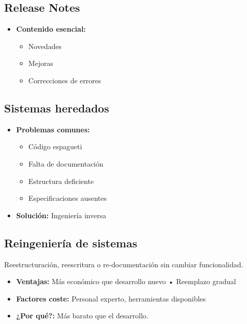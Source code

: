 \subsection{Release Notes}\label{subsec:release-notes}
\begin{itemize}
    \item \textbf{Contenido esencial:}
    \begin{itemize}
        \item Novedades
        \item Mejoras
        \item Correcciones de errores
    \end{itemize}
\end{itemize}

\subsection{Sistemas heredados}\label{subsec:sistemas-heredados}
\begin{itemize}
    \item \textbf{Problemas comunes:}
    \begin{itemize}
        \item Código espagueti
        \item  Falta de documentación
        \item Estructura deficiente
        \item Especificaciones ausentes
    \end{itemize}

    \item \textbf{Solución:} Ingeniería inversa
\end{itemize}

\subsection{Reingeniería de sistemas}\label{subsec:reingenieria-de-sistemas}
\begin{definicion}
    Reestructuración, reescritura o re-documentación sin cambiar funcionalidad.
\end{definicion}

\begin{itemize}
    \item \textbf{Ventajas:} Más económico que desarrollo nuevo • Reemplazo gradual
    \item \textbf{Factores coste:} Personal experto, herramientas disponibles
    \item \textbf{¿Por qué?:} Más barato que el desarrollo.
\end{itemize}

